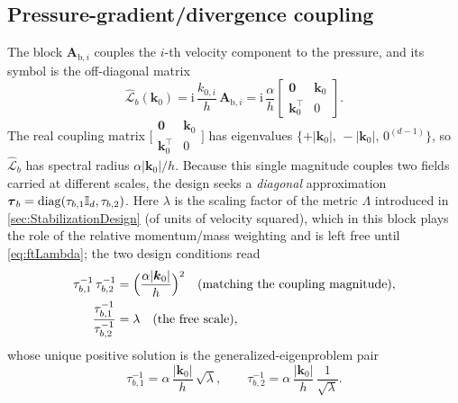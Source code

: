 \subsection{Pressure-gradient/divergence coupling}\label{sec:ftCoupling}
The block $\mathbf{A}_{\mathrm{b},i}$ couples the $i$-th velocity component to the pressure, and its symbol is the off-diagonal matrix
\begin{equation}\label{eq:ftBSymbol}
  \widehat{\mathcal{L}}_{b}(\boldsymbol{k}_0)
  = \mathrm{i}\,\frac{k_{0,i}}{h}\,\mathbf{A}_{\mathrm{b},i}
  = \mathrm{i}\,\frac{\alpha}{h}
    \begin{bmatrix} \mathbf{0} & \boldsymbol{k}_0 \\[2pt] \boldsymbol{k}_0^{\top} & 0 \end{bmatrix}.
\end{equation}
The real coupling matrix $\bigl[\begin{smallmatrix}\mathbf{0}&\boldsymbol{k}_0\\ \boldsymbol{k}_0^{\top}&0\end{smallmatrix}\bigr]$ has eigenvalues $\{+|\boldsymbol{k}_0|,\,-|\boldsymbol{k}_0|,\,0^{(d-1)}\}$, so $\widehat{\mathcal{L}}_b$ has spectral radius $\alpha|\boldsymbol{k}_0|/h$. Because this single magnitude couples two fields carried at different scales, the design seeks a \emph{diagonal} approximation $\boldsymbol{\tau}_b=\operatorname{diag}(\tau_{b,1}\mathbb{I}_d,\tau_{b,2})$. Here $\lambda$ is the scaling factor of the metric $\Lambda$ introduced in \cref{sec:StabilizationDesign} (of units of velocity squared), which in this block plays the role of the relative momentum/mass weighting and is left free until \cref{eq:ftLambda}; the two design conditions read
\begin{equation}\label{eq:ftBdesign}
\begin{aligned}
  \tau_{b,1}^{-1}\,\tau_{b,2}^{-1} &= \Bigl(\frac{\alpha|\boldsymbol{k}_0|}{h}\Bigr)^{2}
  \quad(\text{matching the coupling magnitude}), \\
  \frac{\tau_{b,1}^{-1}}{\tau_{b,2}^{-1}} &= \lambda
  \quad(\text{the free scale}),
\end{aligned}
\end{equation}
whose unique positive solution is the generalized-eigenproblem pair
\begin{equation}\label{eq:ftTauB}
  \tau_{b,1}^{-1} = \alpha\,\frac{|\boldsymbol{k}_0|}{h}\,\sqrt{\lambda},\qquad
  \tau_{b,2}^{-1} = \alpha\,\frac{|\boldsymbol{k}_0|}{h}\,\frac{1}{\sqrt{\lambda}}.
\end{equation}

